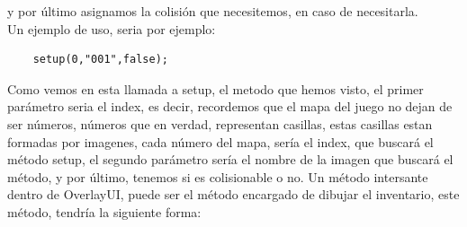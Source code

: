 \documentclass[a4paper]{article}
\begin{document}
y por último asignamos la colisión que necesitemos, en caso de necesitarla.\\
Un ejemplo de uso, seria por ejemplo:
\begin{lstlisting}
    setup(0,"001",false);
\end{lstlisting}
Como vemos en esta llamada a setup, el metodo que hemos visto, el primer parámetro seria el index, es decir, recordemos que el mapa del juego no dejan de ser números, números que en verdad, representan casillas, estas casillas estan formadas por imagenes, 
cada número del mapa, sería el index, que buscará el método setup, el segundo parámetro sería el nombre de la imagen que buscará el método, y por último, tenemos si es colisionable o no.
\clearpage
Un método intersante dentro de OverlayUI, puede ser el método encargado de dibujar el inventario, este método, tendría la siguiente forma:
\end{document}
